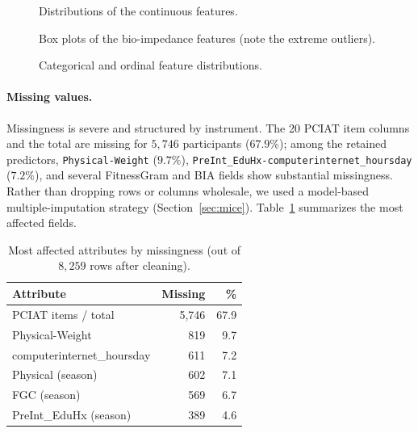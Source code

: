 \begin{figure}[h]
    \centering
    \caption{Distributions of the continuous features.}
    \label{fig:cmi_dists}
\end{figure}

\begin{figure}[h]
    \centering
    \caption{Box plots of the bio-impedance features (note the extreme outliers).}
    \label{fig:cmi_bia_box}
\end{figure}

\begin{figure}[h]
    \centering
    \caption{Categorical and ordinal feature distributions.}
    \label{fig:cmi_cat}
\end{figure}

\paragraph{Missing values.} Missingness is severe and structured by instrument. The 20 PCIAT item columns and the total are missing for $5{,}746$ participants ($67.9\%$); among the retained predictors, \texttt{Physical-Weight} ($9.7\%$), \texttt{PreInt\_EduHx-computerinternet\_hoursday} ($7.2\%$), and several FitnessGram and BIA fields show substantial missingness. Rather than dropping rows or columns wholesale, we used a model-based multiple-imputation strategy (Section~\ref{sec:mice}). Table~\ref{tab:cmi_missing} summarizes the most affected fields.

\begin{table}[H]
\centering
\small
\caption{Most affected attributes by missingness (out of $8{,}259$ rows after cleaning).}
\label{tab:cmi_missing}
\begin{tabular}{l r r}
\hline
Attribute & Missing & \% \\
\hline
PCIAT items / total      & 5{,}746 & 67.9 \\
Physical-Weight          & 819 & 9.7 \\
computerinternet\_hoursday & 611 & 7.2 \\
Physical (season)        & 602 & 7.1 \\
FGC (season)             & 569 & 6.7 \\
PreInt\_EduHx (season)   & 389 & 4.6 \\
\hline
\end{tabular}
\end{table}

